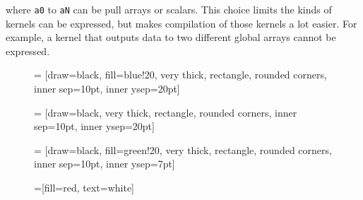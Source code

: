 \noindent
where {\tt a0} to {\tt aN} can be pull arrays or scalars. This choice 
limits the kinds of kernels can be expressed, but
makes compilation of those kernels a lot easier.
For example, a kernel that outputs data to two different global
arrays cannot be expressed.




\begin{figure} 
\def\s{.50}

 = [draw=black, fill=blue!20, very thick,
    rectangle, rounded corners, inner sep=10pt, inner ysep=20pt]

 = [draw=black, very thick,
    rectangle, rounded corners, inner sep=10pt, inner ysep=20pt]

 = [draw=black, fill=green!20, very thick,
    rectangle, rounded corners, inner sep=10pt, inner ysep=7pt]

 =[fill=red, text=white]

\end{figure}

